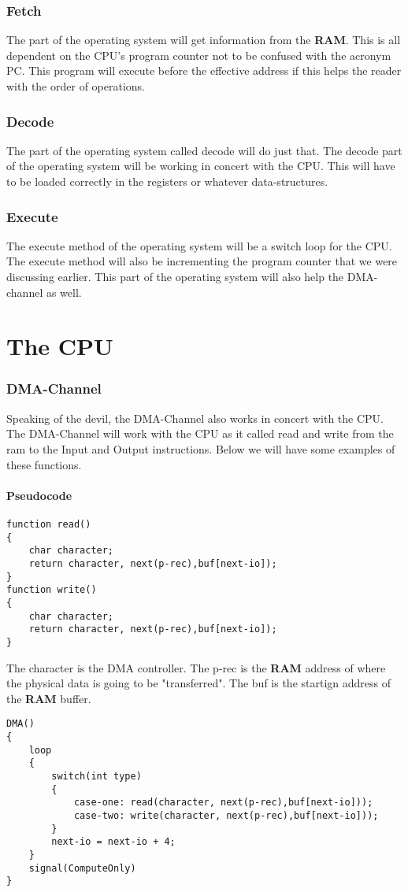 \documentclass{report}
\begin{document}
\section{Fetch}
The part of the operating system will get information from the \textbf{RAM}.
This is all dependent on the CPU's program counter not to be confused with the acronym PC.
This program will execute before the effective address if this helps the reader with the order of operations.

\section{Decode}
The part of the operating system called decode will do just that.
The decode part of the operating system will be working in concert with the CPU.
This will have to be loaded correctly in the registers or whatever data-structures.

\section{Execute}
The execute method of the operating system will be a switch loop for the CPU.
The execute method will also be incrementing the program counter that we were discussing earlier.
This part of the operating system will also help the DMA-channel as well.

\part{The CPU}
\section{DMA-Channel}
Speaking of the devil, the DMA-Channel also works in concert with the CPU.
The DMA-Channel will work with the CPU as it called read and write from the ram to the Input and Output instructions.
Below we will have some examples of these functions.
\subsection{Pseudocode}
\begin{lstlisting}
function read()
{
	char character;
	return character, next(p-rec),buf[next-io]);
}
function write()
{
	char character;
	return character, next(p-rec),buf[next-io]);
}
\end{lstlisting}
The character is the DMA controller.
The p-rec is the \textbf{RAM} address of where the physical data is going to be "transferred".
The buf is the startign address of the \textbf{RAM} buffer.
\begin{lstlisting}
DMA()
{
	loop
	{
		switch(int type)
		{
			case-one: read(character, next(p-rec),buf[next-io]));
			case-two: write(character, next(p-rec),buf[next-io]));
		}
		next-io = next-io + 4;
	}
	signal(ComputeOnly)
}
\end{lstlisting}
\end{document}
